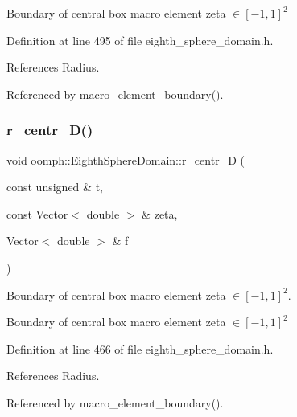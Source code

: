 Boundary of central box macro element zeta $ \in [-1,1]^2 $ 

Definition at line 495 of file eighth\+\_\+sphere\+\_\+domain.\+h.



References Radius.



Referenced by macro\+\_\+element\+\_\+boundary().

\mbox{\label{classoomph_1_1EighthSphereDomain_aa7c38e9c33934b556f59c044654500ce}} 
\subsubsection{\texorpdfstring{r\+\_\+centr\+\_\+\+D()}{r\_centr\_D()}}
{\footnotesize\ttfamily void oomph\+::\+Eighth\+Sphere\+Domain\+::r\+\_\+centr\+\_\+D (\begin{DoxyParamCaption}\item[{const unsigned \&}]{t,  }\item[{const Vector$<$ double $>$ \&}]{zeta,  }\item[{Vector$<$ double $>$ \&}]{f }\end{DoxyParamCaption})\hspace{0.3cm}{\ttfamily [private]}}



Boundary of central box macro element zeta $ \in [-1,1]^2 $. 

Boundary of central box macro element zeta $ \in [-1,1]^2 $ 

Definition at line 466 of file eighth\+\_\+sphere\+\_\+domain.\+h.



References Radius.



Referenced by macro\+\_\+element\+\_\+boundary().

\mbox{\label{classoomph_1_1EighthSphereDomain_a080334e0a4e7cd61c97f0b2bf1174f00}} 
